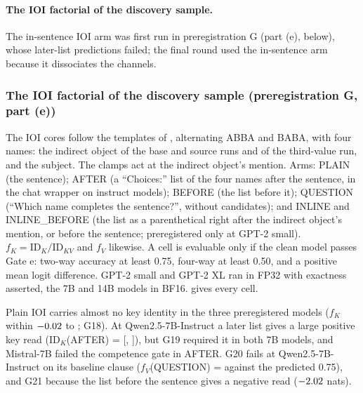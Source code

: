 \paragraph{The IOI factorial of the discovery sample.} The in-sentence IOI arm was first run in preregistration G (part (e), below), whose later-list predictions failed; the final round used the in-sentence arm because it dissociates the channels.

\subsubsection{The IOI factorial of the discovery sample (preregistration G, part (e))}\label{app:g-ioi}

The IOI cores follow the templates of \citet{wang2022ioi}, alternating ABBA and BABA, with four names: the indirect object of the base and source runs and of the third-value run, and the subject. The clamps act at the indirect object's mention. Arms: PLAIN (the sentence); AFTER (a ``Choices:'' list of the four names after the sentence, in the chat wrapper on instruct models); BEFORE (the list before it); QUESTION (``Which name completes the sentence?'', without candidates); and INLINE and INLINE\_BEFORE (the list as a parenthetical right after the indirect object's mention, or before the sentence; preregistered only at GPT-2 small). $f_K = \mathrm{ID}_K/\mathrm{ID}_{KV}$ and $f_V$ likewise. A cell is evaluable only if the clean model passes Gate e: two-way accuracy at least 0.75, four-way at least 0.50, and a positive mean logit difference. GPT-2 small and GPT-2 XL ran in FP32 with exactness asserted, the 7B and 14B models in BF16.  gives every cell.

\begin{table}[!ht]
\centering
\caption{\textbf{IOI} (preregistration G, part (e); 200 fresh cores). Gate e: two-way / four-way accuracy of the clean run (failed cells are not evaluable). $\mathrm{ID}_K$ with 95\% bootstrap CI, $\mathrm{ID}_V$ and $\mathrm{ID}_{KV}$ in nats; $f_K$, $f_V$: shares of $\mathrm{ID}_{KV}$, unstable where $\mathrm{ID}_{KV}$ is near zero. GPT-2 small, Qwen2.5-7B-Instruct and Mistral-7B enter G18--G22 (the GPT-2 small parts replicate a disclosed pilot); Qwen2.5-7B base, Qwen2.5-14B-Instruct and GPT-2 XL are exploratory.}
\label{tab:ioi}
\resizebox{\textwidth}{!}{}
\end{table}

Plain IOI carries almost no key identity in the three preregistered models ($f_K$ within $-0.02$ to \GeighteenFKMax{}; G18). At Qwen2.5-7B-Instruct a later list gives a large positive key read ($\mathrm{ID}_K$(AFTER) = \GeIDKAfterQwenSeven{} [\GeIDKAfterQwenSevenLo{}, \GeIDKAfterQwenSevenHi{}]), but G19 required it in both 7B models, and Mistral-7B failed the competence gate in AFTER. G20 fails at Qwen2.5-7B-Instruct on its baseline clause ($f_V$(QUESTION) = \GeFVQuestionQwenSeven{} against the predicted 0.75), and G21 because the list before the sentence gives a negative read ($-2.02$ nats).

